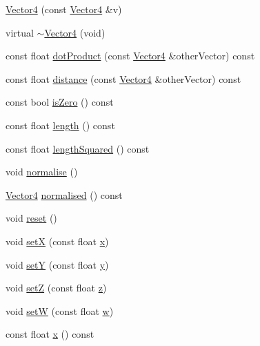 \begin{DoxyCompactItemize}
\item 
\hyperlink{classprism_1_1_vector4_a5ab7b4ef77a247cf7c77d4cec2a0c70d}{Vector4} (const \hyperlink{classprism_1_1_vector4}{Vector4} \&v)
\item 
virtual \hyperlink{classprism_1_1_vector4_ad96aca07468317dde1bcb94a0158e83e}{$\sim$\+Vector4} (void)
\item 
const float \hyperlink{classprism_1_1_vector4_af62f08804a2c00fd3c39ba10b5d45b49}{dot\+Product} (const \hyperlink{classprism_1_1_vector4}{Vector4} \&other\+Vector) const 
\item 
const float \hyperlink{classprism_1_1_vector4_a29b0ec2561b9c27f3b42960f4eab0e6c}{distance} (const \hyperlink{classprism_1_1_vector4}{Vector4} \&other\+Vector) const 
\item 
const bool \hyperlink{classprism_1_1_vector4_a686de6927cb69f8fa9147c517455e388}{is\+Zero} () const 
\item 
const float \hyperlink{classprism_1_1_vector4_a09768873e4146ec004d779d75705457d}{length} () const 
\item 
const float \hyperlink{classprism_1_1_vector4_ac8fb4ba94a951ee6c18cf7a6343f7ae0}{length\+Squared} () const 
\item 
void \hyperlink{classprism_1_1_vector4_a8eb78b21b99dcc26a524bda2f281dd65}{normalise} ()
\item 
\hyperlink{classprism_1_1_vector4}{Vector4} \hyperlink{classprism_1_1_vector4_a453c323b488e145bf209852b9bbaf77a}{normalised} () const 
\item 
void \hyperlink{classprism_1_1_vector4_ab4b162191e642df26a7ef3968ea1cd09}{reset} ()
\item 
void \hyperlink{classprism_1_1_vector4_af8a68ed8ac380ae139601bd86fc652b5}{setX} (const float \hyperlink{classprism_1_1_vector4_a8fabd6d4da0effcc6073f7ae67cb1c1c}{x})
\item 
void \hyperlink{classprism_1_1_vector4_ae03e330f726d405875034641839fea4c}{setY} (const float \hyperlink{classprism_1_1_vector4_ad865f8e0bf0379640510d0be932ba099}{y})
\item 
void \hyperlink{classprism_1_1_vector4_a916ec423bf9611c0035aed0f10d931c3}{setZ} (const float \hyperlink{classprism_1_1_vector4_ae910baf9cdab3dbdf7add459a34c704c}{z})
\item 
void \hyperlink{classprism_1_1_vector4_a187bafc8481b6fc0d5b43711463e0e67}{setW} (const float \hyperlink{classprism_1_1_vector4_a099427d4aea1e37acadc3557d04a1d4c}{w})
\item 
const float \hyperlink{classprism_1_1_vector4_a8fabd6d4da0effcc6073f7ae67cb1c1c}{x} () const 

\end{DoxyCompactItemize}
